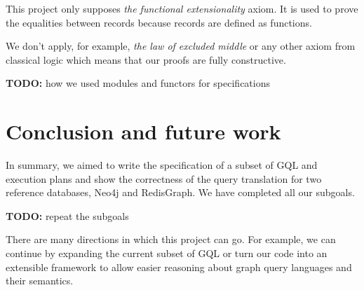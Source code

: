 \documentclass[14pt]{constructor-thesis}
\theoremstyle{definition}
\newcommand{\todo}[1]{
  \begin{tcolorbox}[colframe=red!75!black,colback=red!5!white,arc=0pt,fonttitle=\bfseries]
  \textbf{TODO:} #1
  \end{tcolorbox}
}
\begin{document}
This project only supposes \textit{the functional extensionality} axiom. It is used to prove the equalities between records because records are defined as functions.

We don't apply, for example, \textit{the law of excluded middle} or any other axiom from classical logic which means that our proofs are fully constructive.

\todo{how we used modules and functors for specifications}

\section*{Conclusion and future work}

In summary, we aimed to write the specification of a subset of GQL and execution plans and show the correctness of the query translation for two reference databases, Neo4j and RedisGraph. We have completed all our subgoals.

\todo{repeat the subgoals}

There are many directions in which this project can go. For example, we can continue by expanding the current subset of GQL or turn our code into an extensible framework to allow easier reasoning about graph query languages and their semantics.

\setmonofont[Mapping=tex-text]{CMU Typewriter Text}
% 
% 
\printbibliography
\end{document}
